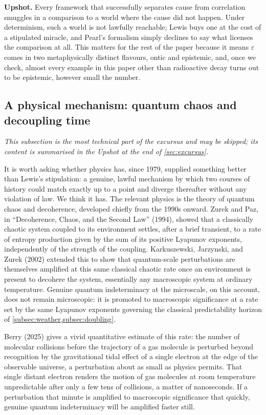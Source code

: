 \documentclass[11pt]{article}
\theoremstyle{definition}
\newenvironment{skipnote}
  {\par\smallskip\noindent\itshape\small}
  {\par\smallskip\noindent}
\newcommand{\upshot}[1]{\par\smallskip\noindent\textbf{Upshot.} #1\par\smallskip}
\newcommand{\eps}{\varepsilon}
\begin{document}
\upshot{Every framework that successfully separates cause from correlation smuggles in a comparison to a world where the cause did not happen. Under determinism, such a world is not lawfully reachable; Lewis buys one at the cost of a stipulated miracle, and Pearl's formalism simply declines to say what licenses the comparison at all. This matters for the rest of the paper because it means $\eps$ comes in two metaphysically distinct flavours, ontic and epistemic, and, once we check, almost every example in this paper other than radioactive decay turns out to be epistemic, however small the number.}

\subsection{A physical mechanism: quantum chaos and decoupling time}
\label{subsec:decoupling}

\begin{skipnote}
This subsection is the most technical part of the excursus and may be skipped; its content is summarised in the Upshot at the end of \cref{sec:excursus}.
\end{skipnote}

It is worth asking whether physics has, since 1979, supplied something better than Lewis's stipulation: a genuine, lawful mechanism by which two courses of history could match exactly up to a point and diverge thereafter without any violation of law. We think it has. The relevant physics is the theory of quantum chaos and decoherence, developed chiefly from the 1990s onward. Zurek and Paz, in ``Decoherence, Chaos, and the Second Law'' (1994), showed that a classically chaotic system coupled to its environment settles, after a brief transient, to a rate of entropy production given by the sum of its positive Lyapunov exponents, independently of the strength of the coupling. Karkuszewski, Jarzynski, and Zurek (2002) extended this to show that quantum-scale perturbations are themselves amplified at this same classical chaotic rate once an environment is present to decohere the system, essentially any macroscopic system at ordinary temperature. Genuine quantum indeterminacy at the microscale, on this account, does not remain microscopic: it is promoted to macroscopic significance at a rate set by the same Lyapunov exponents governing the classical predictability horizon of \cref{subsec:weather,subsec:doubling}.

Berry (2025) gives a vivid quantitative estimate of this rate: the number of molecular collisions before the trajectory of a gas molecule is perturbed beyond recognition by the gravitational tidal effect of a single electron at the edge of the observable universe, a perturbation about as small as physics permits. That single distant electron renders the motion of gas molecules at room temperature unpredictable after only a few tens of collisions, a matter of nanoseconds. If a perturbation that minute is amplified to macroscopic significance that quickly, genuine quantum indeterminacy will be amplified faster still.
\end{document}

